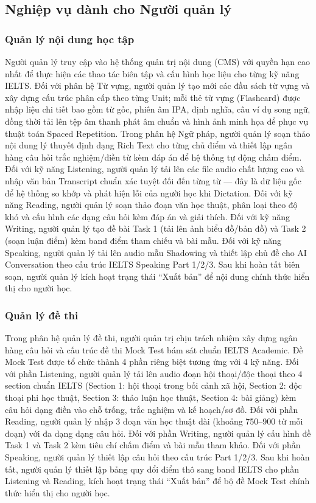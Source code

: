 \documentclass[a4paper,12pt]{extreport}
\begin{document}
\subsection{Nghiệp vụ dành cho Người quản lý}

\subsubsection{Quản lý nội dung học tập}
Người quản lý truy cập vào hệ thống quản trị nội dung (CMS) với quyền hạn cao nhất để thực hiện các thao tác biên tập và cấu hình học liệu cho từng kỹ năng IELTS. Đối với phân hệ Từ vựng, người quản lý tạo mới các đầu sách từ vựng và xây dựng cấu trúc phân cấp theo từng Unit; mỗi thẻ từ vựng (Flashcard) được nhập liệu chi tiết bao gồm từ gốc, phiên âm IPA, định nghĩa, câu ví dụ song ngữ, đồng thời tải lên tệp âm thanh phát âm chuẩn và hình ảnh minh họa để phục vụ thuật toán Spaced Repetition. Trong phân hệ Ngữ pháp, người quản lý soạn thảo nội dung lý thuyết định dạng Rich Text cho từng chủ điểm và thiết lập ngân hàng câu hỏi trắc nghiệm/điền từ kèm đáp án để hệ thống tự động chấm điểm. Đối với kỹ năng Listening, người quản lý tải lên các file audio chất lượng cao và nhập văn bản Transcript chuẩn xác tuyệt đối đến từng từ — đây là dữ liệu gốc để hệ thống so khớp và phát hiện lỗi của người học khi Dictation. Đối với kỹ năng Reading, người quản lý soạn thảo đoạn văn học thuật, phân loại theo độ khó và cấu hình các dạng câu hỏi kèm đáp án và giải thích. Đối với kỹ năng Writing, người quản lý tạo đề bài Task 1 (tải lên ảnh biểu đồ/bản đồ) và Task 2 (soạn luận điểm) kèm band điểm tham chiếu và bài mẫu. Đối với kỹ năng Speaking, người quản lý tải lên audio mẫu Shadowing và thiết lập chủ đề cho AI Conversation theo cấu trúc IELTS Speaking Part 1/2/3. Sau khi hoàn tất biên soạn, người quản lý kích hoạt trạng thái ``Xuất bản'' để nội dung chính thức hiển thị cho người học. 

\subsubsection{Quản lý đề thi}
Trong phân hệ quản lý đề thi, người quản trị chịu trách nhiệm xây dựng ngân hàng câu hỏi và cấu trúc đề thi Mock Test bám sát chuẩn IELTS Academic. Đề Mock Test được tổ chức thành 4 phần riêng biệt tương ứng với 4 kỹ năng. Đối với phần Listening, người quản lý tải lên audio đoạn hội thoại/độc thoại theo 4 section chuẩn IELTS (Section 1: hội thoại trong bối cảnh xã hội, Section 2: độc thoại phi học thuật, Section 3: thảo luận học thuật, Section 4: bài giảng) kèm câu hỏi dạng điền vào chỗ trống, trắc nghiệm và kế hoạch/sơ đồ. Đối với phần Reading, người quản lý nhập 3 đoạn văn học thuật dài (khoảng 750–900 từ mỗi đoạn) với đa dạng dạng câu hỏi. Đối với phần Writing, người quản lý cấu hình đề Task 1 và Task 2 kèm tiêu chí chấm điểm và bài mẫu tham khảo. Đối với phần Speaking, người quản lý thiết lập câu hỏi theo cấu trúc Part 1/2/3. Sau khi hoàn tất, người quản lý thiết lập bảng quy đổi điểm thô sang band IELTS cho phần Listening và Reading, kích hoạt trạng thái ``Xuất bản'' để bộ đề Mock Test chính thức hiển thị cho người học. 
\end{document}
